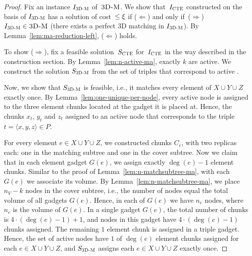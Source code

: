 \begin{proof}
  
  Fix an instance $I_{\mathrm{\textsc{3D-M}}}$ of~$\textsc{3D-M}$.
  We show that~$I_{\mathrm{\textsc{CTE}}}$ constructed on the basis of $I_{\mathrm{\textsc{3D-M}}}$ has a solution of cost~$\leq \xi$ if ($\Leftarrow$) and only if~($\Rightarrow$) $I_{\mathrm{\textsc{3D-M}}} \in \textsc{3D-M}$ (there exists a perfect 3D matching in $I_{\mathrm{\textsc{3D-M}}}$).
  By Lemma~\ref{lem:ma-reduction-left}, ($\Leftarrow$) holds.

  To show ($\Rightarrow$), fix a feasible solution~$S_{\mathrm{\textsc{CTE}}}$ for~$I_{\mathrm{\textsc{CTE}}}$ in the way described in the construction section.
  By Lemma~\ref{lem:n-active-ma}, exactly $k$ \TripleGadgets{} are active.
  We construct the solution $S_{\mathrm{\textsc{3D-M}}}$ from the set of triples that correspond to active \TripleGadgets{}.

  Now, we show that $S_{\mathrm{\textsc{3D-M}}}$ is feasible, i.e., it matches every element of $X\cup Y\cup Z$ exactly once.
  By Lemma~\ref{lem:one-unique-per-node}, every active node is assigned to the three element chunks located at the gadget it is placed at.
  Hence, the chunks $x_t$, $y_t$ and $z_t$ assigned to an active node that corresponds to the triple $t = \langle x, y, z \rangle \in P$.
  
  For every element $e\in X\cup Y \cup Z$, we constructed chunks $C_e$, with two replicas each: one in the matching subtree and one in the cover subtree.
  Now we claim that in each element gadget $G(e)$, we assign exactly $\deg(e) - 1$ element chunks.
  Similar to the proof of Lemma~\ref{lem:n-matchsubtree-ma}, with each $G(e)$ we associate its volume.
  By Lemma~\ref{lem:n-matchsubtree-ma}, we place $n_V-k$ nodes in the cover subtree, i.e., the number of nodes equal the total volume of all gadgets $G(e)$.
  Hence, in each of $G(e)$ we have $n_e$ nodes, where $n_e$ is the volume of $G(e)$.
  In a single gadget $G(e)$, the total number of chunks is $4\cdot(\deg(e) - 1) + 1$, and nodes in this gadget have $4\cdot(\deg(e)-1)$ chunks assigned.
   The remaining $1$ element chunk is assigned in a triple gadget.
  Hence, the set of active nodes have $1$ of $\deg(e)$ element chunks assigned for each $e\in X\cup Y\cup Z$, and $S_{\mathrm{\textsc{3D-M}}}$ assigns each $e\in X\cup Y\cup Z$ exactly once.
 
%
  

\end{proof}
